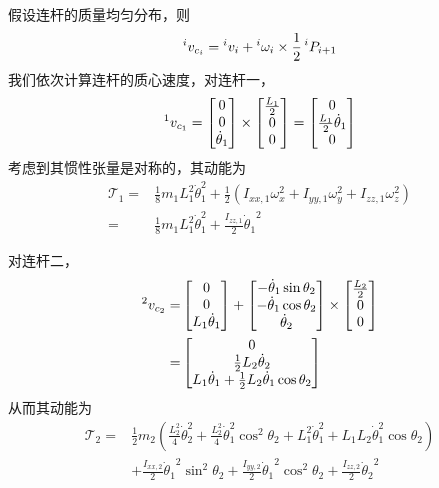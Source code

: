 \documentclass{ctexart}
\begin{document}
假设连杆的质量均匀分布，则
\[
\prescript{i}{}{v_{c_{i}}} 
    = \prescript{i}{}{v_i} + \prescript{i}{ }{\omega_i} \times \frac{1}{2} \prescript{i}{}{P_{i+1}}
\]
我们依次计算连杆的质心速度，对连杆一，
\[
    \prescript{1}{}{v_{c_1}} = \begin{bmatrix}
        0 \\ 0 \\ \dot\theta_1
    \end{bmatrix} \times \begin{bmatrix}
        \frac{L_1}{2} \\ 0 \\ 0
    \end{bmatrix} = \begin{bmatrix}
       0 \\ \frac{L_1}{2} \dot \theta_1 \\ 0
    \end{bmatrix}
\]
考虑到其惯性张量是对称的，其动能为
\[
    \begin{aligned}
        \mathcal T_1 
        = & \frac{1}{8} m_1 L_1^2 \dot\theta_1^2 + \frac{1}{2} (I_{xx,1} \omega_x^2 + I_{yy,1} \omega_y^2 + I_{zz,1} \omega_z^2) \\
        = & \frac{1}{8} m_1 L_1^2 \dot\theta_1^2 + \frac{I_{zz,1}}{2} {\dot \theta_1}^2
    \end{aligned}
\]

对连杆二，
\[
    \begin{aligned}
        \prescript{2}{}{v_{c_2}} = &
        \begin{bmatrix}
            0 \\ 0 \\ L_1 \dot \theta_1
        \end{bmatrix} +
        \begin{bmatrix}
            -\dot \theta_1 \sin\theta_2 \\
            -\dot \theta_1 \cos\theta_2 \\
            \dot \theta_2
        \end{bmatrix} \times \begin{bmatrix}
            \frac{L_2}{2} \\ 0 \\ 0
        \end{bmatrix} \\
        = & \begin{bmatrix}
            0 \\ 
            \frac{1}{2} L_2 \dot \theta_2 \\ 
            L_1 \dot \theta_1 + \frac{1}{2} L_2 \dot \theta_1 \cos \theta_2
        \end{bmatrix}
    \end{aligned}
\]
从而其动能为
\[
    \begin{aligned}
        \mathcal T_2 = & \frac{1}{2} m_2 (\frac{L_2^2}{4} \dot \theta_2^2 + \frac{L_2^2}{4}\dot\theta_1^2 \cos^2 \theta_2 + L_1^2 \dot\theta_1^2 + L_1 L_2 \dot\theta_1^2 \cos\theta_2) \\
        & + \frac{I_{xx,2}}{2} {\dot\theta_1}^2 \sin^2\theta_2+ \frac{I_{yy,2}}{2} {\dot\theta_1}^2 \cos^2\theta_2 + \frac{I_{zz,2}}{2} {\dot\theta_2}^2\\
    \end{aligned}
\]
\end{document}
